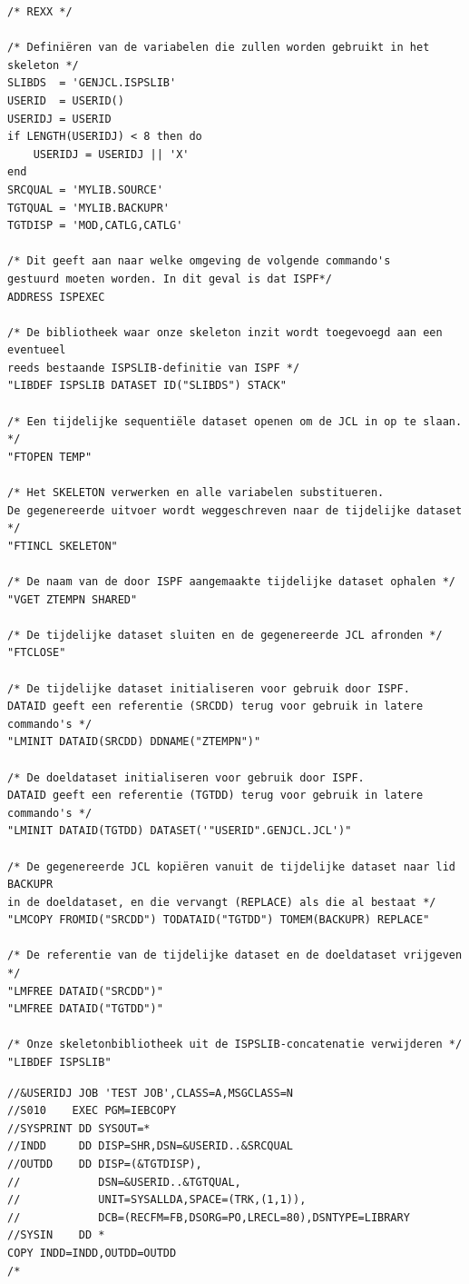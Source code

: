 \begin{verbatim}
/* REXX */

/* Definiëren van de variabelen die zullen worden gebruikt in het skeleton */
SLIBDS  = 'GENJCL.ISPSLIB'
USERID  = USERID()
USERIDJ = USERID
if LENGTH(USERIDJ) < 8 then do
    USERIDJ = USERIDJ || 'X'
end
SRCQUAL = 'MYLIB.SOURCE'
TGTQUAL = 'MYLIB.BACKUPR'
TGTDISP = 'MOD,CATLG,CATLG'

/* Dit geeft aan naar welke omgeving de volgende commando's 
gestuurd moeten worden. In dit geval is dat ISPF*/
ADDRESS ISPEXEC

/* De bibliotheek waar onze skeleton inzit wordt toegevoegd aan een eventueel
reeds bestaande ISPSLIB-definitie van ISPF */
"LIBDEF ISPSLIB DATASET ID("SLIBDS") STACK"

/* Een tijdelijke sequentiële dataset openen om de JCL in op te slaan. */
"FTOPEN TEMP"

/* Het SKELETON verwerken en alle variabelen substitueren.
De gegenereerde uitvoer wordt weggeschreven naar de tijdelijke dataset */
"FTINCL SKELETON"

/* De naam van de door ISPF aangemaakte tijdelijke dataset ophalen */
"VGET ZTEMPN SHARED"

/* De tijdelijke dataset sluiten en de gegenereerde JCL afronden */
"FTCLOSE"

/* De tijdelijke dataset initialiseren voor gebruik door ISPF.
DATAID geeft een referentie (SRCDD) terug voor gebruik in latere commando's */
"LMINIT DATAID(SRCDD) DDNAME("ZTEMPN")"

/* De doeldataset initialiseren voor gebruik door ISPF.
DATAID geeft een referentie (TGTDD) terug voor gebruik in latere commando's */
"LMINIT DATAID(TGTDD) DATASET('"USERID".GENJCL.JCL')"

/* De gegenereerde JCL kopiëren vanuit de tijdelijke dataset naar lid BACKUPR
in de doeldataset, en die vervangt (REPLACE) als die al bestaat */
"LMCOPY FROMID("SRCDD") TODATAID("TGTDD") TOMEM(BACKUPR) REPLACE"

/* De referentie van de tijdelijke dataset en de doeldataset vrijgeven */
"LMFREE DATAID("SRCDD")"
"LMFREE DATAID("TGTDD")"

/* Onze skeletonbibliotheek uit de ISPSLIB-concatenatie verwijderen */
"LIBDEF ISPSLIB"
\end{verbatim}


\begin{verbatim}
//&USERIDJ JOB 'TEST JOB',CLASS=A,MSGCLASS=N
//S010    EXEC PGM=IEBCOPY
//SYSPRINT DD SYSOUT=*
//INDD     DD DISP=SHR,DSN=&USERID..&SRCQUAL
//OUTDD    DD DISP=(&TGTDISP),
//            DSN=&USERID..&TGTQUAL,
//            UNIT=SYSALLDA,SPACE=(TRK,(1,1)),
//            DCB=(RECFM=FB,DSORG=PO,LRECL=80),DSNTYPE=LIBRARY
//SYSIN    DD *
COPY INDD=INDD,OUTDD=OUTDD
/*
\end{verbatim}



